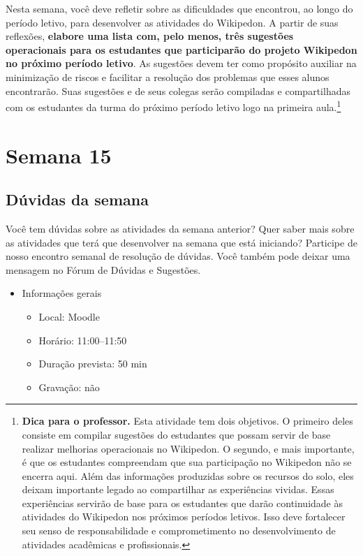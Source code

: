 \documentclass[
  11pt,
  a4paper,
  dvipsnames]{tufte-book}
\providecommand{\tightlist}{%
  \setlength{\itemsep}{0pt}\setlength{\parskip}{0pt}}
\begin{document}
Nesta semana, você deve refletir sobre as dificuldades que encontrou, ao longo do período letivo, para desenvolver as atividades do Wikipedon. A partir de suas reflexões, \textbf{elabore uma lista com, pelo menos, três sugestões operacionais para os estudantes que participarão do projeto Wikipedon no próximo período letivo}. As sugestões devem ter como propósito auxiliar na minimização de riscos e facilitar a resolução dos problemas que esses alunos encontrarão. Suas sugestões e de seus colegas serão compiladas e compartilhadas com os estudantes da turma do próximo período letivo logo na primeira aula.\footnote{\textbf{Dica para o professor.} Esta atividade tem dois objetivos. O primeiro deles consiste em compilar sugestões do estudantes que possam servir de base realizar melhorias operacionais no Wikipedon. O segundo, e mais importante, é que os estudantes compreendam que sua participação no Wikipedon não se encerra aqui. Além das informações produzidas sobre os recursos do solo, eles deixam importante legado ao compartilhar as experiências vividas. Essas experiências servirão de base para os estudantes que darão continuidade às atividades do Wikipedon nos próximos períodos letivos. Isso deve fortalecer seu senso de responsabilidade e comprometimento no desenvolvimento de atividades acadêmicas e profissionais.}

\hypertarget{semana-15}{%
\chapter{Semana 15}\label{semana-15}}

\hypertarget{duxfavidas-da-semana-13}{%
\section{Dúvidas da semana}\label{duxfavidas-da-semana-13}}

Você tem dúvidas sobre as atividades da semana anterior? Quer saber mais sobre as atividades que terá que desenvolver na semana que está iniciando? Participe de nosso encontro semanal de resolução de dúvidas. Você também pode deixar uma mensagem no Fórum de Dúvidas e Sugestões.

\begin{itemize}
\tightlist
\item
  Informações gerais

  \begin{itemize}
  \tightlist
  \item
    Local: Moodle
  \item
    Horário: 11:00--11:50
  \item
    Duração prevista: 50 min
  \item
    Gravação: não
  \end{itemize}
\end{itemize}

  
\end{document}
